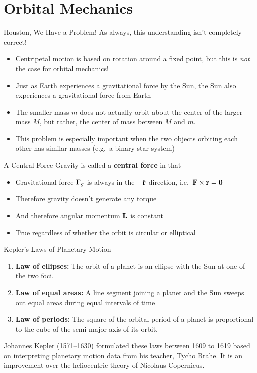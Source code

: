 \documentclass[12pt,compress,aspectratio=169]{beamer}
\newcommand{\mb}[1]{\ensuremath\mathbf{#1}}
\begin{document}
\section{Orbital Mechanics}

\begin{frame}{Houston, We Have a Problem!}
  As always, this understanding isn't completely correct!
  \begin{itemize}
  \item Centripetal motion is based on rotation around a fixed point, but this
    is \emph{not} the case for orbital mechanics!
  \item Just as Earth experiences a gravitational force by the Sun, the Sun
    also experiences a gravitational force from Earth
  \item The smaller mass $m$ does not actually orbit about the center of the
    larger mass $M$, but rather, the center of mass between $M$ and $m$.
  \item This problem is especially important when the two objects orbiting each
    other has similar masses (e.g.\ a binary star system)
  \end{itemize}
\end{frame}



\begin{frame}{A Central Force}
  Gravity is called a \textbf{central force} in that
  \begin{itemize}
  \item Gravitational force $\mb{F}_g$ is always in the $-\hat{\mb{r}}$
    direction, i.e.\ $\mb{F}\times\mb{r}=\mb{0}$
  \item Therefore gravity doesn't generate any torque
  \item And therefore angular momentum $\mb{L}$ is constant
  \item True regardless of whether the orbit is circular or elliptical
  \end{itemize}
\end{frame}


\begin{frame}{Kepler's Laws of Planetary Motion}
  \begin{enumerate}
  \item\textbf{Law of ellipses:} The orbit of a planet is an ellipse with the
    Sun at one of the two foci.
  \item\textbf{Law of equal areas:} A line segment joining a planet and the Sun
    sweeps out equal areas during equal intervals of time
  \item \textbf{Law of periods:} The square of the orbital period of a planet
    is proportional to the cube of the semi-major axis of its orbit.
  \end{enumerate}

  \vspace{.3in}Johannes Kepler (1571--1630) formulated these laws between 1609
  to 1619 based on interpreting planetary motion data from his teacher, Tycho
  Brahe. It is an improvement over the heliocentric theory of Nicolaus
  Copernicus.
\end{frame}
\end{document}
